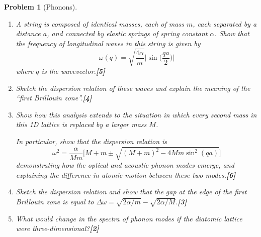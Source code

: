\documentclass[a4paper]{article}
\theoremstyle{new}
\newtheorem{qns}{Problem}[subsection]
\begin{document}
\begin{qns}[Phonons]\leavevmode
\begin{enumerate}[label=(\roman*)]
\item A string is composed of identical masses, each of mass $m$, each separated by a distance $a$, and connected by elastic springs of spring constant $\alpha$. Show that the frequency of longitudinal waves in this string is given by
$$\omega(q)=\sqrt{\frac{4\alpha}{m}}\bigg|\sin\bigg(\frac{qa}{2}\bigg)\bigg|$$
where $q$ is the wavevector.\hfill\textbf{[5]}
\item Sketch the dispersion relation of these waves and explain the meaning of the “first Brillouin zone”.\hfill\textbf{[4]}
\item Show how this analysis extends to the situation in which every second mass in this 1D lattice is replaced by a larger mass $M$. 
\begin{mdframed}
\color{darkblue}{Hint: This can be considered as a 1D diatomic lattice with a period $2a$.}
\end{mdframed}
In particular, show that the dispersion relation is
$$\omega^2=\frac{\alpha}{Mm}\bigg[M+m\pm\sqrt{(M+m)^2-4Mm\sin^2(qa)}\bigg]$$
demonstrating how the optical and acoustic phonon modes emerge, and explaining the difference in atomic motion between these two modes.\hfill\textbf{[6]}
\item Sketch the dispersion relation and show that the gap at the edge of the first Brillouin zone is equal to $\Delta\omega=\sqrt{2\alpha/m}-\sqrt{2\alpha/M}$.\hfill\textbf{[3]}
\item What would change in the spectra of phonon modes if the diatomic lattice were three-dimensional?\hfill\textbf{[2]}
\end{enumerate}
\end{qns}
\end{document}

